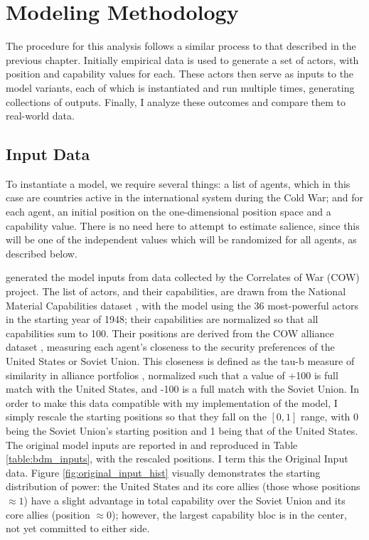 \section{Modeling Methodology}

The procedure for this analysis follows a similar process to that described in the previous chapter. Initially empirical data is used to generate a set of actors, with position and capability values for each. These actors then serve as inputs to the model variants, each of which is instantiated and run multiple times, generating collections of outputs. Finally, I analyze these outcomes and compare them to real-world data.

\subsection{Input Data} \label{sec:input_data}

To instantiate a model, we require several things: a list of agents, which in this case are countries active in the international system during the Cold War; and for each agent, an initial position on the one-dimensional position space and a capability value. There is no need here to attempt to estimate salience, since this will be one of the independent values which will be randomized for all agents, as described below.

\citet{bdm_1998} generated the model inputs from data collected by the Correlates of War (COW) project. The list of actors, and their capabilities, are drawn from the National Material Capabilities dataset \citep{singer_1972,singer_1988}, with the model using the 36 most-powerful actors in the starting year of 1948; their capabilities are normalized so that all capabilities sum to 100. Their positions are derived from the COW alliance dataset \citep{singer_1969}, measuring each agent's closeness to the security preferences of the United States or Soviet Union. This closeness is defined as the tau-b measure of similarity in alliance portfolios \citep{bdm_1975}, normalized such that a value of +100 is full match with the United States, and -100 is a full match with the Soviet Union. In order to make this data compatible with my implementation of the model, I simply rescale the starting positions so that they fall on the ${[0, 1]}$ range, with 0 being the Soviet Union's starting position and 1 being that of the United States. The original model inputs are reported in \citet{bdm_1998} and reproduced in Table \ref{table:bdm_inputs}, with the rescaled positions. I term this the Original Input data. Figure \ref{fig:original_input_hist} visually demonstrates the starting distribution of power: the United States and its core allies (those whose positions $\approx 1$) have a slight advantage in total capability over the Soviet Union and its core allies (position $\approx 0$); however, the largest capability bloc is in the center, not yet committed to either side.

